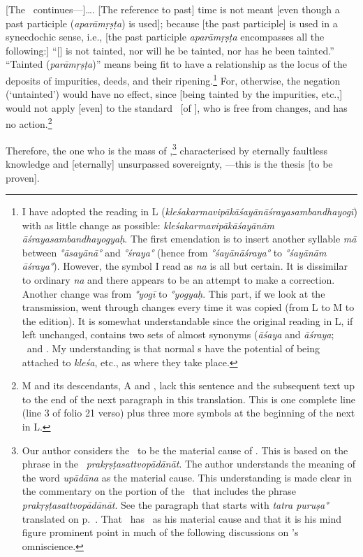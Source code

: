 [The %
\Bhasyakara\ continues---]\ldots.  [The reference to past] time is not meant [even though a past participle (\emph{aparāmṛṣṭa}) is used]; because [the past participle] is used in a synecdochic sense, i.e., [the past participle \emph{aparāmṛṣṭa} encompasses all the following:] ``[\Isvara] is not tainted, nor will he be tainted, nor has he been tainted.''  ``Tainted (\emph{parāmṛṣṭa})'' means being fit to have a relationship as the locus of the deposits of impurities, deeds, and their ripening.\footnote{I have adopted the reading in L (\emph{kleśa\-karma\-vipākā\-śayā\-nā\-śraya\-sambandha\-yogī}) with as little change as possible: \emph{\emph{kleśa\-karma\-vipākā\-śayā\-nām ā\-śraya\-sambandha\-yogyaḥ}}. The first emendation is to insert another syllable \emph{mā} between \emph{°āsayānā°} and \emph{°śraya°} (hence from \emph{°śayānāśraya°} to \emph{°śayānām āśraya°}). However, the symbol I read as \emph{na} is all but certain. It is dissimilar to ordinary \emph{na} and there appears to be an attempt to make a correction. Another change was from \emph{°yogī} to \emph{°yogyaḥ}. This part, if we look at the transmission, went through changes every time it was copied (from L to M to the edition). It is somewhat understandable since the original reading in L, if left unchanged, contains two sets of almost synonyms (\emph{āśaya} and \emph{āśraya}; \sambandha\ and \yogin. My understanding is that normal \purusa s have the potential of being attached to \emph{kleśa}, etc., as where they take place.}  For, otherwise, the negation (`untainted') would have no effect, since [being tainted by the impurities, etc.,] would not apply [even] to the standard \purusa\ [of \Samkhya], who is free from changes, and has no action.\footnote{M and its descendants, A and \Me, lack this sentence and the subsequent text up to the end of the next paragraph in this translation. This is one complete line (line 3 of folio 21 verso) plus three more symbols at the beginning of the next in L\@.}

Therefore, %
 the one who is the mass of \sattva,\footnote{\label{STVNT24}Our author considers the \sattva\ to be the material cause of \Isvara.  This is based on the phrase in the \bhasya\ \emph{prakṛṣṭasattvopādānāt}.  The author understands the meaning of the word \emph{upādāna} as the material cause.  This understanding is made clear in the commentary on the portion of the \bhasya\ that includes the phrase \emph{prakṛṣṭasattvopādānāt}.  See the paragraph  that starts with \emph{tatra puruṣa°} translated on p.~\pageref{UPDNMTL25}.  That \Isvara\ has \sattva\ as his material cause and that it is his mind figure prominent point in much of the following discussions on \Isvara's omniscience.} characterised by eternally faultless knowledge and [eternally] unsurpassed sovereignty, ---this is the thesis [to be proven].

